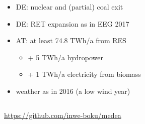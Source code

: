 \documentclass[aspectratio=1610, xcolor=dvipsnames]{beamer}
\begin{document}
\begin{frame}
\begin{columns}[T]
            \begin{column}{7cm}
                \begin{itemize}
                    \item DE: nuclear and (partial) coal exit
                    \item DE: RET expansion as in EEG 2017
                    \item AT: at least 74.8 TWh/a from RES
                    \begin{itemize}
                        \item + 5 TWh/a hydropower
                        \item + 1 TWh/a electricity from biomass
                    \end{itemize}
                    \item weather as in 2016 (a low wind year)
                \end{itemize}
            \end{column}
        \end{columns}
        \bigskip
        \begin{center}
            \url{https://github.com/inwe-boku/medea}
        \end{center}
    \end{frame}
\end{document}
